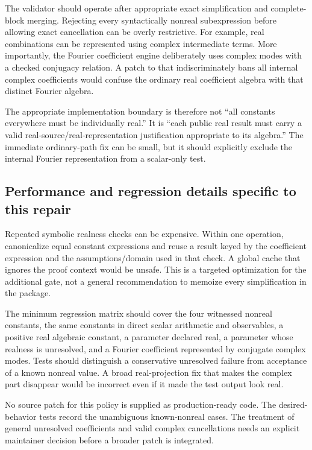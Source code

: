 \documentclass[11pt,letterpaper]{article}
\newcommand{\code}[1]{\texttt{\detokenize{#1}}}
\begin{document}
The validator should operate after appropriate exact simplification and complete-block merging. Rejecting every syntactically nonreal subexpression before allowing exact cancellation can be overly restrictive. For example, real combinations can be represented using complex intermediate terms. More importantly, the Fourier coefficient engine deliberately uses complex modes with a checked conjugacy relation. A patch to \code{pConst} that indiscriminately bans all internal complex coefficients would confuse the ordinary real coefficient algebra with that distinct Fourier algebra.\cite{repo-fourier}

The appropriate implementation boundary is therefore not ``all constants everywhere must be individually real.'' It is ``each public real result must carry a valid real-source/real-representation justification appropriate to its algebra.'' The immediate ordinary-path fix can be small, but it should explicitly exclude the internal Fourier representation from a scalar-only test.

\subsection{Performance and regression details specific to this repair}
Repeated symbolic realness checks can be expensive. Within one operation, canonicalize equal constant expressions and reuse a result keyed by the coefficient expression and the assumptions/domain used in that check. A global cache that ignores the proof context would be unsafe. This is a targeted optimization for the additional gate, not a general recommendation to memoize every simplification in the package.

The minimum regression matrix should cover the four witnessed nonreal constants, the same constants in direct scalar arithmetic and observables, a positive real algebraic constant, a parameter declared real, a parameter whose realness is unresolved, and a Fourier coefficient represented by conjugate complex modes. Tests should distinguish a conservative unresolved failure from acceptance of a known nonreal value. A broad real-projection fix that makes the complex part disappear would be incorrect even if it made the test output look real.

No source patch for this policy is supplied as production-ready code. The desired-behavior tests record the unambiguous known-nonreal cases. The treatment of general unresolved coefficients and valid complex cancellations needs an explicit maintainer decision before a broader patch is integrated.
\end{document}
